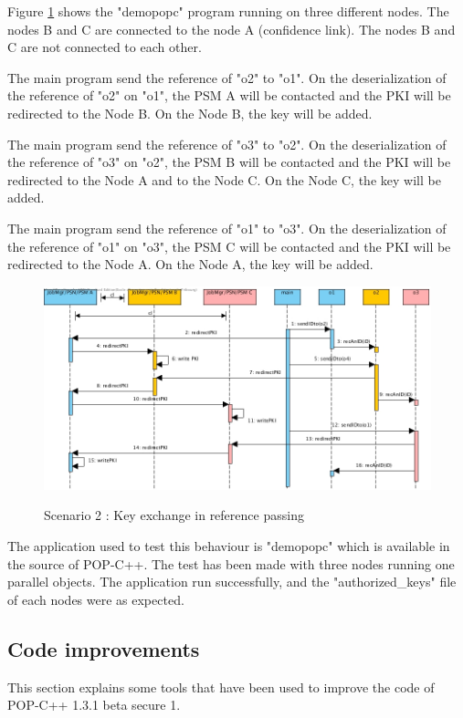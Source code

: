 Figure \ref{fig:ke_refpassing} shows the "demopopc" program running on three different nodes. The nodes B and C are connected to the node A (confidence link). The nodes B and C are not connected to each other. \s

The main program send the reference of "o2" to "o1". On the deserialization of the reference of "o2" on "o1", the PSM A will be contacted and the PKI will be redirected to the Node B. On the Node B, the key will be added.\s

The main program send the reference of "o3" to "o2". On the deserialization of the reference of "o3" on "o2", the PSM B will be contacted and the PKI will be redirected to the Node A and to the Node C. On the Node C, the key will be added.\s

The main program send the reference of "o1" to "o3". On the deserialization of the reference of "o1" on "o3", the PSM C will be contacted and the PKI will be redirected to the Node A. On the Node A, the key will be added.\s


\begin{figure}[!ht]
	\caption{Scenario 2 : Key exchange in reference passing}
  	\centering
	\includegraphics[width=1.0\textwidth]{../ke_refpassing.jpg}
	\label{fig:ke_refpassing}
\end{figure}

The application used to test this behaviour is "demopopc" which is available in the source of POP-C++. The test has been made with three nodes running one parallel objects. The application run successfully, and the "authorized\_keys" file of each nodes were as expected. 

\pagebreak
\subsection{Code improvements}
This section explains some tools that have been used to improve the code of POP-C++ 1.3.1 beta secure 1.

